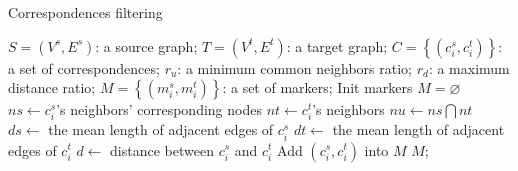 \begin{algorithm}[!t]
    \renewcommand\arraystretch{1.2}
    \caption{ Correspondences filtering }
    \label{alg:corrselection}
    \begin{algorithmic}[1]
      \Require
        $S=(V^s, E^s)$: a source graph;
        $T=(V^t, E^t)$: a target graph;
        $C=\left\{(c^s_i, c^t_i)\right\}$: a set of correspondences;
        $r_u$: a minimum common neighbors ratio;
        $r_d$: a maximum distance ratio;
      \Ensure
      $M=\left\{(m^s_i, m^t_i)\right\}$: a set of markers;
      \State Init markers $M=\varnothing$ \label{code:initmarker}
        \State $ns \gets c^s_i$'s neighbors' corresponding nodes
        \State $nt \gets c^t_i$'s neighbors
        \State $nu \gets ns \bigcap nt$
            \State $ds \gets$ the mean length of adjacent edges of $c^s_i$
            \State $dt \gets$ the mean length of adjacent edges of $c^t_i$
            \State $d \gets$ distance between $c^s_i$ and $c^t_i$
                \State Add $(c^s_i, c^t_i)$ into $M$
            \EndIf
        \EndIf
      \EndFor
      \State \Return $M$;
    \end{algorithmic}
\end{algorithm}

